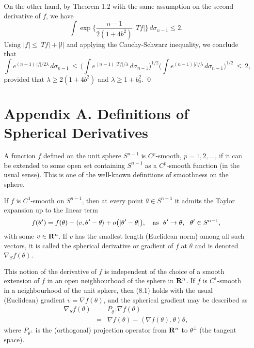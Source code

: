 \documentclass[reqno,12pt]{amsart}
\theoremstyle{plain}
\begin{document}
On the other hand, by Theorem 1.2 with the same assumption on the second
derivative of $f$, we have
$$
\int \exp\Big\{\frac{n-1}{2(1+4b^2)}\, |Tf|\Big\}\, d\sigma_{n-1} \leq 2.
$$
Using $|f| \leq |Tf| + |l|$ and applying the Cauchy-Schwarz inequality,
we conclude that
$$
\int e^{(n-1)\, |f|/2\lambda}\,d\sigma_{n-1}
 \, \leq \,
\Big(\int e^{(n-1)\, |Tf|/\lambda}\,d\sigma_{n-1}\Big)^{1/2}
\Big(\int e^{(n-1)\, |l|/\lambda}\,d\sigma_{n-1}\Big)^{1/2} \, \leq \, 2,
$$
provided that $\lambda \geq 2(1+4b^2)$ and $\lambda \geq 1 + b_0^2$.
\qed

\vskip10mm
\section{{\bf Appendix A. Definitions of Spherical Derivatives}}
\setcounter{equation}{0}

\vskip2mm
\noindent
A function $f$ defined on the unit sphere $S^{n-1}$ is $C^p$-smooth, 
$p = 1,2,\dots$, if it can be extended to some open set
containing $S^{n-1}$ as a $C^p$-smooth function (in the usual sense). 
This is one of the well-known definitions of smoothness on the sphere.

If $f$ is $C^1$-smooth on $S^{n-1}$, then at every point $\theta \in S^{n-1}$ 
it admits the Taylor expansion up to the linear term
\begin{equation}
f(\theta') = f(\theta) + \left<v,\theta' - \theta\right> +
o\big(|\theta' - \theta|\big), \quad {\rm as} \ \ 
\theta' \rightarrow \theta, \ \ \theta' \in S^{n-1},
\end{equation}
with some $v \in {{\bf R}}^n$. If $v$ has the smallest length (Euclidean norm) 
among all such vectors, it is called the spherical derivative or 
gradient of $f$ at $\theta$ and is denoted $\nabla_S f(\theta)$. 

This notion of the derivative of $f$ is independent of the choice of a 
smooth extension of $f$ in an open neighbourhood of the sphere in ${{\bf R}}^n$.
If $f$ is $C^1$-smooth in a neighbourhood of the unit 
sphere, then (8.1) holds with the usual (Euclidean) gradient 
$v = \nabla f(\theta)$, and the spherical gradient may be described as 
\begin{eqnarray*}
\nabla_S f(\theta) 
 & = & 
P_{\theta^\perp} \nabla f(\theta) \\
 & = &
\nabla f(\theta) - \left<\nabla f(\theta),\theta\right> \theta, 
\end{eqnarray*}
where $P_{\theta^\perp}$ is the (orthogonal) projection operator 
from ${{\bf R}}^n$ to $\theta^\perp$ (the tangent space). 
\end{document}
